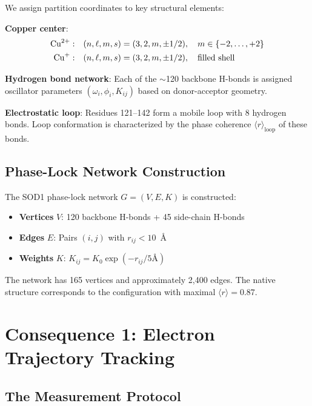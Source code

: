 \documentclass[twocolumn,aps,prx,superscriptaddress,longbibliography]{revtex4-2}
\theoremstyle{remark}
\newcommand{\orderpar}{\langle r \rangle}
\begin{document}
We assign partition coordinates to key structural elements:

\textbf{Copper center}:
\begin{align}
\ce{Cu^{2+}}: \quad & (n, \ell, m, s) = (3, 2, m, \pm 1/2), \quad m \in \{-2,\ldots,+2\} \\
\ce{Cu^{+}}: \quad & (n, \ell, m, s) = (3, 2, m, \pm 1/2), \quad \text{filled shell}
\end{align}

\textbf{Hydrogen bond network}: Each of the $\sim$120 backbone H-bonds
is assigned oscillator parameters $(\omega_i, \phi_i, K_{ij})$ based on
donor-acceptor geometry.

\textbf{Electrostatic loop}: Residues 121--142 form a mobile loop with
8 hydrogen bonds. Loop conformation is characterized by the phase
coherence $\orderpar_\text{loop}$ of these bonds.

\subsection{Phase-Lock Network Construction}

The SOD1 phase-lock network $G = (V, E, K)$ is constructed:

\begin{itemize}
    \item \textbf{Vertices} $V$: 120 backbone H-bonds + 45 side-chain H-bonds
    \item \textbf{Edges} $E$: Pairs $(i,j)$ with $r_{ij} < 10$~\AA
    \item \textbf{Weights} $K$: $K_{ij} = K_0 \exp(-r_{ij}/5\text{\AA})$
\end{itemize}

The network has 165 vertices and approximately 2,400 edges. The native
structure corresponds to the configuration with maximal $\orderpar = 0.87$.

\section{Consequence 1: Electron Trajectory Tracking}
\label{sec:electron}

\subsection{The Measurement Protocol}
\end{document}
